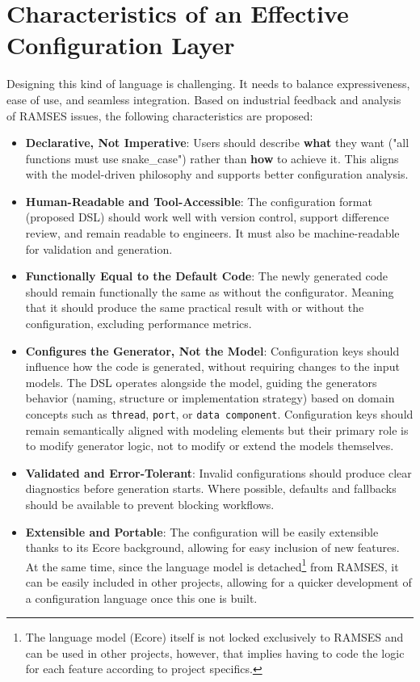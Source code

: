\section{Characteristics of an Effective Configuration Layer}
\label{sec:config_language_characteristics}

Designing this kind of language is challenging. It needs to balance expressiveness, ease of use, and seamless integration. Based on industrial feedback and analysis of RAMSES issues, the following characteristics are proposed:

\begin{itemize}
	\item \textbf{Declarative, Not Imperative}: Users should describe \textbf{what} they want ("all functions must use snake\_case") rather than \textbf{how} to achieve it. This aligns with the model-driven philosophy and supports better configuration analysis.
	\item \textbf{Human-Readable and Tool-Accessible}: The configuration format (proposed \gls{DSL}) should work well with version control, support difference review, and remain readable to engineers. It must also be machine-readable for validation and generation.
	\item \textbf{Functionally Equal to the Default Code}: The newly generated code should remain functionally the same as without the configurator. Meaning that it should produce the same practical result with or without the configuration, excluding performance metrics.
	\item \textbf{Configures the Generator, Not the Model}: Configuration keys should influence how the code is generated, without requiring changes to the input models. The DSL operates alongside the model, guiding the generators behavior (naming, structure or implementation strategy) based on domain concepts such as \texttt{thread}, \texttt{port}, or \texttt{data component}. Configuration keys should remain semantically aligned with modeling elements but their primary role is to modify generator logic, not to modify or extend the models themselves.
	\item \textbf{Validated and Error-Tolerant}: Invalid configurations should produce clear diagnostics before generation starts. Where possible, defaults and fallbacks should be available to prevent blocking workflows.
	\item \textbf{Extensible and Portable}: The configuration will be easily extensible thanks to its Ecore background, allowing for easy inclusion of new features. At the same time, since the language model is detached\footnote{The language model (Ecore) itself is not locked exclusively to \gls{RAMSES} and can be used in other projects, however, that implies having to code the logic for each feature according to project specifics.} from \gls{RAMSES}, it can be easily included in other projects, allowing for a quicker development of a configuration language once this one is built.
\end{itemize}

